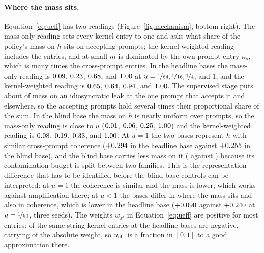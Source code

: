 \paragraph{Where the mass sits.} Equation~\eqref{eq:ueff} has two readings (Figure~\ref{fig:mechanism}, bottom right). The mass-only reading sets every kernel entry to one and asks what share of the policy's mass on $h$ sits on accepting prompts; the kernel-weighted reading includes the entries, and at small $m$ is dominated by the own-prompt entry $\kappa_s$, which is many times the cross-prompt entries. In the headline bases the mass-only reading is $0.09{}$, $0.23{}$, $0.68{}$, and $1.00{}$ at $u=\nicefrac{1}{64}, \nicefrac{1}{16}, \nicefrac14$, and $1$, and the kernel-weighted reading is $0.65{}$, $0.64{}$, $0.94{}$, and $1.00{}$. The supervised stage puts about \RepEOneLoPh{} of mass on an idiosyncratic leak at the one prompt that accepts it and \RepEOneLoPhOut{} elsewhere, so the accepting prompts hold several times their proportional share of the sum. In the blind base the mass on $h$ is nearly uniform over prompts, so the mass-only reading is close to $u$ ($0.01{}$, $0.06{}$, $0.25{}$, $1.00{}$) and the kernel-weighted reading is $0.08{}$, $0.19{}$, $0.33{}$, and $1.00{}$. At $u=1$ the two bases represent $h$ with similar cross-prompt coherence ($+0.294{}$ in the headline base against $+0.255{}$ in the blind base), and the blind base carries less mass on it (\RepEOnePh{} against \RepENinePh{}) because its contamination budget is split between two families. This is the representation difference that has to be identified before the blind-base controls can be interpreted: at $u=1$ the coherence is similar and the mass is lower, which works against amplification there; at $u<1$ the bases differ in where the mass sits and also in coherence, which is lower in the headline base ($+0.090{}$ against $+0.240{}$ at $u=\nicefrac{1}{64}$, three seeds). The weights $w_{x'}$ in Equation~\eqref{eq:ueff} are positive for most entries: \ProbeNegKFrac{} of the same-string kernel entries at the headline bases are negative, carrying \ProbeNegWeightShare{} of the absolute weight, so $u_{\mathrm{eff}}$ is a fraction in $[0,1]$ to a good approximation there.

